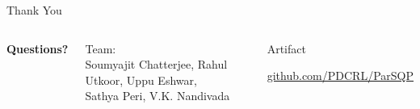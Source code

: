 \begin{frame}{Thank You}
  
  \vspace*{\fill} %
  
  \begin{columns}[T,onlytextwidth]
    
    \centering
    \Huge \textbf{Questions?}
    
    \vspace{1.5cm}
    
  
    
    \normalsize
    Team: \\
    \small
    Soumyajit Chatterjee, Rahul Utkoor, Uppu Eshwar, \\ Sathya Peri, V.K. Nandivada
    
    \begin{block}{Artifact}
      \centering
      
      \vspace{2mm}
      \href{https://github.com/PDCRL/ParSQP}{github.com/PDCRL/ParSQP}
    \end{block}
    
  \end{columns}
  
  \vspace*{\fill} %
  
\end{frame}